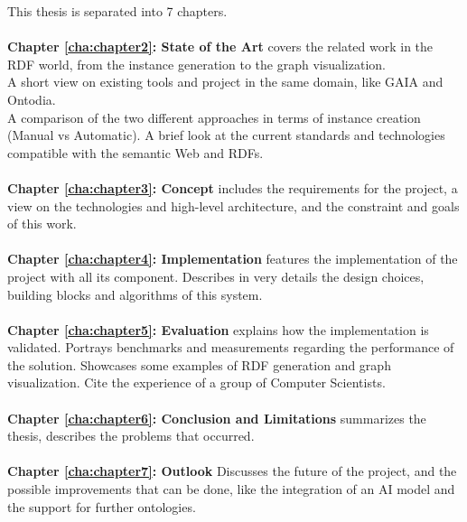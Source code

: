 This thesis is separated into 7 chapters.
\\
\\
\textbf{Chapter \ref{cha:chapter2}: State of the Art} covers the related work in the RDF world, from the instance generation to the graph visualization. 
\\
A short view on existing tools and project in the same domain, like GAIA and Ontodia.
\\
A comparison of the two different approaches in terms of instance creation (Manual vs Automatic).
A brief look at the current standards and technologies compatible with the semantic Web and RDFs.
\\
\\
\textbf{Chapter \ref{cha:chapter3}: Concept} includes the requirements for the project, a view on the technologies and high-level architecture, and the constraint and goals of this work.
\\
\\
\textbf{Chapter \ref{cha:chapter4}: Implementation} features the implementation of the project with all its component. Describes in very details the design choices, building blocks and algorithms of this system.
\\
\\
\textbf{Chapter \ref{cha:chapter5}: Evaluation} explains how the implementation is validated. Portrays benchmarks and measurements regarding the performance of the solution. Showcases some examples of RDF generation and graph visualization. Cite the experience of a group of Computer Scientists. 
\\
\\
\textbf{Chapter \ref{cha:chapter6}: Conclusion and Limitations} summarizes the thesis, describes the problems that occurred. 
\\
\\
\textbf{Chapter \ref{cha:chapter7}: Outlook} Discusses the future of the project, and the possible improvements that can be done, like the integration of an AI model and the support for further ontologies.